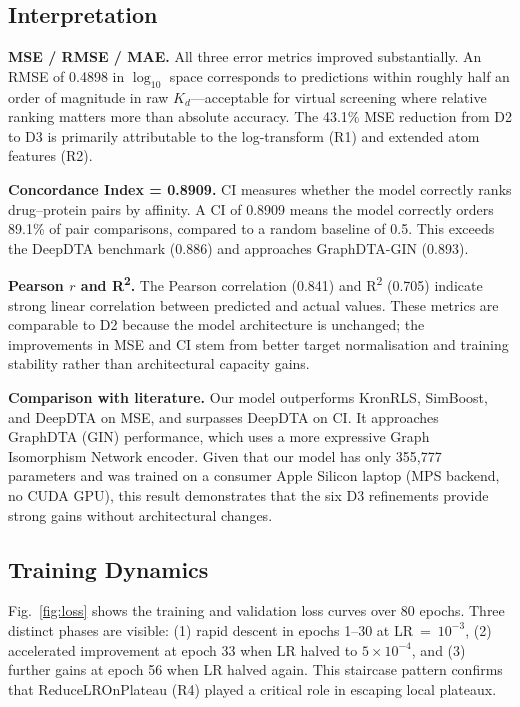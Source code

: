 \documentclass[conference]{IEEEtran}
\begin{document}
\subsection{Interpretation}

\textbf{MSE / RMSE / MAE.}
All three error metrics improved substantially. An RMSE of 0.4898 in
$\log_{10}$ space corresponds to predictions within roughly half an order of
magnitude in raw $K_d$---acceptable for virtual screening where relative
ranking matters more than absolute accuracy. The 43.1\% MSE reduction from D2
to D3 is primarily attributable to the log-transform (R1) and extended atom
features (R2).

\textbf{Concordance Index = 0.8909.}
CI measures whether the model correctly ranks drug--protein pairs by affinity.
A CI of 0.8909 means the model correctly orders 89.1\% of pair comparisons,
compared to a random baseline of 0.5. This exceeds the DeepDTA benchmark
(0.886) and approaches GraphDTA-GIN (0.893).

\textbf{Pearson $r$ and R\textsuperscript{2}.}
The Pearson correlation (0.841) and R\textsuperscript{2} (0.705) indicate
strong linear correlation between predicted and actual values. These metrics
are comparable to D2 because the model architecture is unchanged; the
improvements in MSE and CI stem from better target normalisation and training
stability rather than architectural capacity gains.

\textbf{Comparison with literature.}
Our model outperforms KronRLS, SimBoost, and DeepDTA on MSE, and surpasses
DeepDTA on CI. It approaches GraphDTA (GIN) performance, which uses a more
expressive Graph Isomorphism Network encoder. Given that our model has only
355,777 parameters and was trained on a consumer Apple Silicon laptop (MPS
backend, no CUDA GPU), this result demonstrates that the six D3 refinements
provide strong gains without architectural changes.

\subsection{Training Dynamics}

Fig.~\ref{fig:loss} shows the training and validation loss curves over 80
epochs. Three distinct phases are visible: (1) rapid descent in epochs 1--30
at LR~=~$10^{-3}$, (2) accelerated improvement at epoch 33 when LR halved to
$5\times10^{-4}$, and (3) further gains at epoch 56 when LR halved again.
This staircase pattern confirms that ReduceLROnPlateau (R4) played a critical
role in escaping local plateaux.
\end{document}
